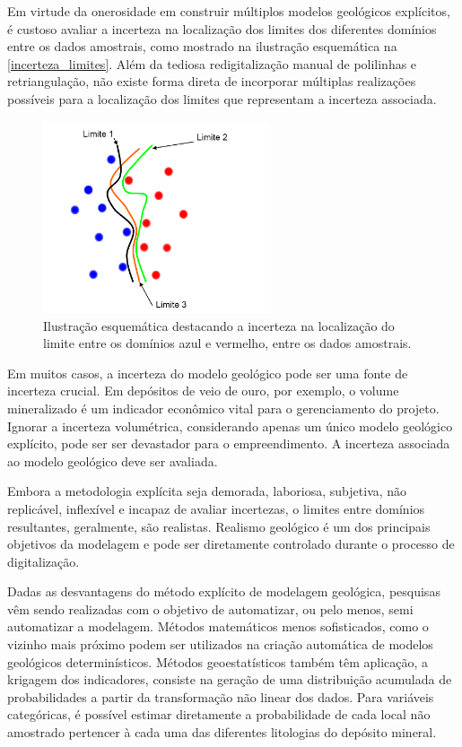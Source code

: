 Em virtude da onerosidade em construir múltiplos modelos geológicos explícitos, é custoso avaliar a incerteza na localização dos limites dos diferentes domínios entre os dados amostrais, como mostrado na ilustração esquemática na \autoref{incerteza_limites}. Além da tediosa redigitalização manual de polilinhas e retriangulação, não existe forma direta de incorporar múltiplas realizações possíveis para a localização dos limites que representam a incerteza associada.

\begin{figure}[H]
	\caption{\label{incerteza_limites}Ilustração esquemática destacando a incerteza na localização do limite entre os domínios azul e vermelho, entre os dados amostrais.}
	\begin{center}
		\includegraphics[width=0.6\textwidth]{capitulo_1/incerteza_limites}
	\end{center}
\end{figure}

Em muitos casos, a incerteza do modelo geológico pode ser uma fonte de incerteza crucial. Em depósitos de veio de ouro, por exemplo, o volume mineralizado é um indicador econômico vital para o gerenciamento do projeto. Ignorar a incerteza volumétrica, considerando apenas um único modelo geológico explícito, pode ser ser devastador para o empreendimento. A incerteza associada ao modelo geológico deve ser avaliada.

Embora a metodologia explícita seja demorada, laboriosa, subjetiva, não replicável, inflexível e incapaz de avaliar incertezas, o limites entre domínios resultantes, geralmente, são realistas. Realismo geológico é um dos principais objetivos da modelagem e pode ser diretamente controlado durante o processo de digitalização. 

Dadas as desvantagens do método explícito de modelagem geológica, pesquisas vêm sendo realizadas com o objetivo de automatizar, ou pelo menos, semi automatizar a modelagem. Métodos matemáticos menos sofisticados, como o vizinho mais próximo podem ser utilizados na criação automática de modelos geológicos determinísticos.  Métodos geoestatísticos também têm aplicação, a krigagem dos indicadores, \cite{journel1982indicator} consiste na geração de uma distribuição acumulada de probabilidades a partir da transformação não linear dos dados. Para variáveis categóricas, é possível estimar diretamente a probabilidade de cada local não amostrado pertencer à cada uma das diferentes litologias do depósito mineral.

